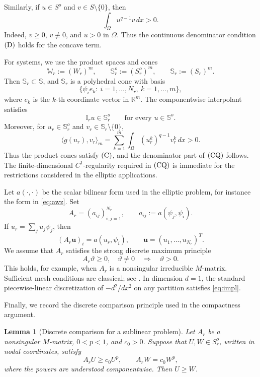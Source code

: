 \documentclass[preprint,10pt]{elsarticle}
\numberwithin{equation}{section}
\newtheorem{lem}[thm]{Lemma}
\begin{document}
Similarly, if \(u\in S^o\) and \(v\in S\setminus\{0\}\), then
\[
\int_\Omega u^{q-1}v\,dx>0 .
\]
Indeed, \(v\ge0\), \(v\not\equiv0\), and \(u>0\) in \(\Omega\).
Thus the continuous denominator condition \({\rm (D)}\) holds for the
concave term.

For systems, we use the product spaces and cones
\[
\mathbb W_r:=(W_r)^m,
\qquad
\mathbb S_r^o:=(S_r^o)^m,
\qquad
\mathbb S_r:=(S_r)^m .
\]
Then \(\mathbb S_r\subset\mathbb S\), and \(\mathbb S_r\) is a polyhedral cone
with basis
\[
\{\psi_i e_k:\ i=1,\ldots,N_r,\ k=1,\ldots,m\},
\]
where \(e_k\) is the \(k\)-th coordinate vector in \(\mathbb R^m\). The
componentwise interpolant satisfies
\[
\mathbb I_r u\in\mathbb S_r^o
\qquad
\text{for every }u\in\mathbb S^o .
\]
Moreover, for
\(u_r\in\mathbb S_r^o\) and
\(v_r\in\mathbb S_r\setminus\{0\}\),
\[
\langle g(u_r),v_r\rangle_m
=
\sum_{k=1}^m
\int_\Omega (u_r^k)^{q-1}v_r^k\,dx
>0 .
\]
Thus the product cones satisfy \({\rm (C)}\), and the denominator part of
\({\rm (CQ)}\) follows. The finite-dimensional \(C^1\)-regularity required in
\({\rm (CQ)}\) is immediate for the restrictions considered in the elliptic
applications.

Let \(a(\cdot,\cdot)\) be the scalar bilinear form used in the elliptic
problem, for instance the form in \eqref{eq:awz}. Set
\[
A_r=(a_{ij})_{i,j=1}^{N_r},
\qquad
a_{ij}:=a(\psi_j,\psi_i).
\]
If \(u_r=\sum_j u_j\psi_j\), then
\[
(A_r\mathbf u)_i=a(u_r,\psi_i),
\qquad
\mathbf u=(u_1,\ldots,u_{N_r})^T .
\]
We assume that \(A_r\) satisfies the strong discrete maximum principle
\begin{equation}\label{eq:impl}
	A_r\vartheta\ge0,\quad \vartheta\ne0
	\quad\Longrightarrow\quad
	\vartheta>0 .
\end{equation}
This holds, for example, when \(A_r\) is a nonsingular irreducible
\(M\)-matrix. Sufficient mesh conditions are classical; see
\cite{brand,ciaretRav,ciaret,Varga}. In dimension \(d=1\), the standard
piecewise-linear discretization of \(-d^2/dx^2\) on any partition satisfies
\eqref{eq:impl}.

Finally, we record the discrete comparison principle used in the compactness
argument.

\begin{lem}[Discrete comparison for a sublinear problem]
	\label{lem:discrete-comparison-sublinear}
	Let \(A_r\) be a nonsingular \(M\)-matrix, \(0<p<1\), and \(c_0>0\).
	Suppose that \(U,W\in S_r^o\), written in nodal coordinates, satisfy
	\[
	A_rU\ge c_0U^p,
	\qquad
	A_rW=c_0W^p ,
	\]
	where the powers are understood componentwise. Then \(U\ge W\).
\end{lem}
\end{document}
